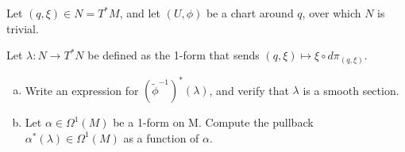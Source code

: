 \documentclass{article}
\newenvironment{problem}[2][Problem]{\begin{trivlist}
\item[\hskip \labelsep {\bfseries #1}\hskip \labelsep {\bfseries #2.}]}{\end{trivlist}}
\begin{document}
\pagebreak

\begin{problem}{4}
  Let $(q, \xi) \in N = T^*M$, and let $(U, \phi)$ be a chart around $q$, over
  which $N$ is trivial.

  Let $\lambda\colon N \rightarrow T^*N$ be defined as the 1-form that sends
  $(q, \xi) \mapsto \xi \circ d\pi_{(q, \xi)}$.

  \begin{enumerate}[(a)]
    \item Write an expression for $(\tilde{\phi}^{-1})^*(\lambda)$, and verify
    that $\lambda$ is a smooth section.
    \item Let $\alpha \in \Omega^1(M)$ be a 1-form on M.
    Compute the pullback $\alpha^*(\lambda) \in \Omega^1(M)$ as a function of $\alpha$.
  \end{enumerate}
\end{problem}
\end{document}
